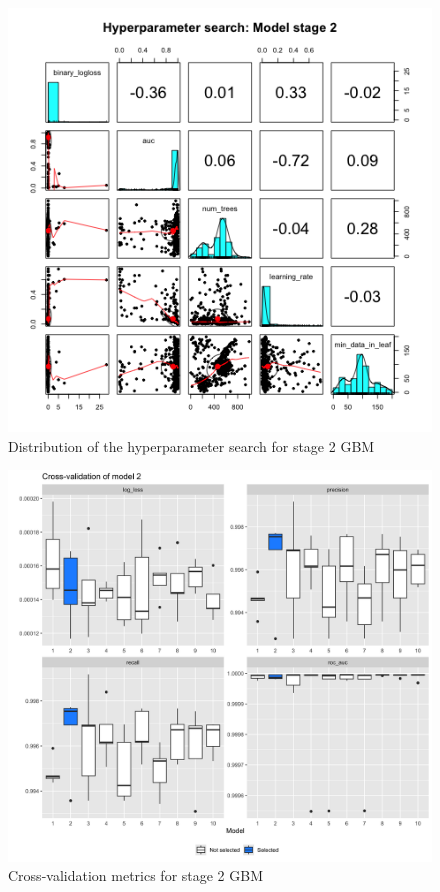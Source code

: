 \documentclass{article}
\begin{document}
\begin{figure}[H]
\centering
\includegraphics[width=0.9\linewidth]{splot_stage_2.png} 
\caption{Distribution of the hyperparameter search for stage 2 GBM}
\label{splot_2}
\end{figure}

\begin{figure}[H]
\centering
\includegraphics[width=0.9\linewidth]{boxplot_stage_2.png} 
\caption{Cross-validation metrics for stage 2 GBM} 
\label{cv_2}
\end{figure}
\end{document}

